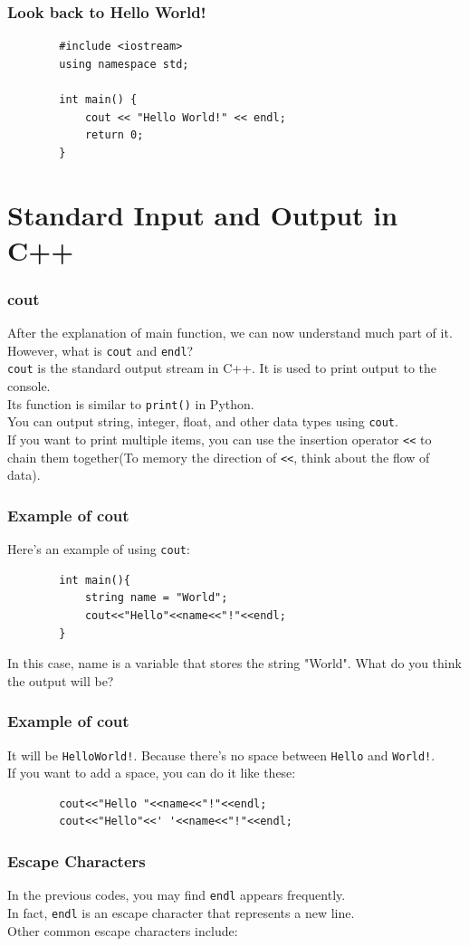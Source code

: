 \documentclass[xcolor=dvipsnames]{beamer}
\begin{document}
    \begin{frame}[fragile]
        \frametitle{Look back to Hello World!}
        \begin{verbatim}
        #include <iostream>
        using namespace std;

        int main() {
            cout << "Hello World!" << endl;
            return 0;
        }
        \end{verbatim}
    \end{frame}

    \section{Standard Input and Output in C++}
    \begin{frame}
        \frametitle{cout}
        After the explanation of main function, we can now understand much part of it. However, what is \texttt{cout} and \texttt{endl}?\\
        \texttt{cout} is the standard output stream in C++. It is used to print output to the console.\\Its function is similar to \texttt{print()} in Python.\\
        You can output string, integer, float, and other data types using \texttt{cout}.\\
        If you want to print multiple items, you can use the insertion operator \texttt{<<} to chain them together(To memory the direction of \texttt{<<}, think about the flow of data).
    \end{frame}

    \begin{frame}[fragile]
        \frametitle{Example of cout}
        Here's an example of using \texttt{cout}:
        \begin{verbatim}
        int main(){
            string name = "World";
            cout<<"Hello"<<name<<"!"<<endl;
        }
        \end{verbatim}
        In this case, name is a variable that stores the string "World". What do you think the output will be?
    \end{frame}

    \begin{frame}[fragile]
        \frametitle{Example of cout}
        It will be \texttt{HelloWorld!}. Because there's no space between \texttt{Hello} and \texttt{World!}.\\
        If you want to add a space, you can do it like these:
        \begin{verbatim}
        cout<<"Hello "<<name<<"!"<<endl;
        cout<<"Hello"<<' '<<name<<"!"<<endl;
        \end{verbatim}
    \end{frame}

    \begin{frame}
        \frametitle{Escape Characters}
        In the previous codes, you may find \texttt{endl} appears frequently.\\
        In fact, \texttt{endl} is an escape character that represents a new line.\\
        Other common escape characters include:
        
    \end{frame}
    
\end{document}
